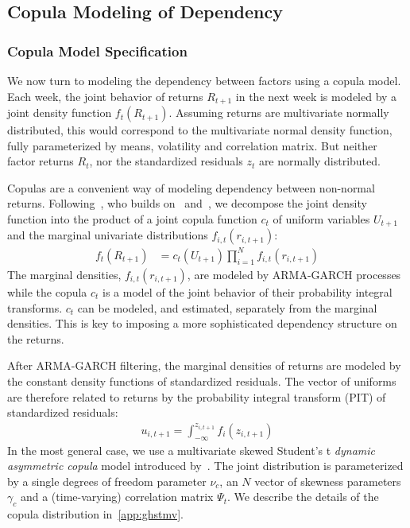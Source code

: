 
\subsection{Copula Modeling of Dependency} %
\label{sub:05_04_copula}

\subsubsection{Copula Model Specification}

We now turn to modeling the dependency between factors using a copula model. 
Each week, the joint behavior of returns $R_{t+1}$ in the next week is modeled by a joint density function $f_t(R_{t+1})$. Assuming returns are multivariate normally distributed, this would correspond to the multivariate normal density function, fully parameterized by means, volatility and correlation matrix. But neither factor returns $R_t$, nor the standardized residuals $z_t$ are normally distributed.

Copulas are a convenient way of modeling dependency between non-normal returns. Following~\textcite{ChristoffersenErrunzaJacobLanglois2012}, who builds on~\textcite{Patton2006} and~\textcite{Sklar1959}, we decompose the joint density function into the product of a joint copula function $c_t$ of uniform variables $U_{t+1}$ and the marginal univariate distributions $f_{i,t}(r_{i, t+1})$:
\begin{align}
  f_t(R_{t+1}) &=
    c_t(U_{t+1}) \prod^N_{i = 1} f_{i,t}(r_{i, t + 1})
\end{align}
The marginal densities, $f_{i,t}(r_{i, t + 1})$, are modeled by ARMA-GARCH processes while the copula $c_t$ is a model of the joint behavior of their probability integral transforms. $c_t$ can be modeled, and estimated, separately from the marginal densities. This is key to imposing a more sophisticated dependency structure on the returns.

After ARMA-GARCH filtering, the marginal densities of returns are modeled by the constant density functions of standardized residuals. The vector of uniforms are therefore related to returns by the probability integral transform (PIT) of standardized residuals:
\begin{align}
  u_{i, t+1} = \int_{-\infty}^{z_{i,t+1}} f_{i}(z_{i,t+1})
\end{align}
In the most general case, we use a multivariate skewed Student's t \emph{dynamic asymmetric copula} model introduced by~\textcite{ChristoffersenErrunzaJacobLanglois2012}. The joint distribution is parameterized by a single degrees of freedom parameter $\nu_c$, an $N$ vector of skewness parameters $\gamma_{c}$ and a (time-varying) correlation matrix $\Psi_{t}$. We describe the details of the copula distribution in~\autoref{app:ghstmv}.

